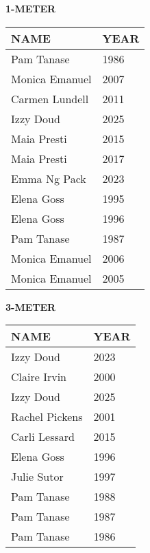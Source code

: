 \begin{table}[H]
\centering
\begin{minipage}[t]{0.6\textwidth}
\centering
\textbf{1-METER}\\[0.1cm]
\begin{tabular}{@{}p{2.8cm}p{1.2cm}@{}}
\hline
    \textbf{NAME} & \textbf{YEAR} \\
\hline
    Pam Tanase & 1986 \\
    Monica Emanuel & 2007 \\
    Carmen Lundell & 2011 \\
    Izzy Doud & 2025 \\
    Maia Presti & 2015 \\
    Maia Presti & 2017 \\
    Emma Ng Pack & 2023 \\
    Elena Goss & 1995 \\
    Elena Goss & 1996 \\
    Pam Tanase & 1987 \\
    Monica Emanuel & 2006 \\
    Monica Emanuel & 2005 \\
\hline
\end{tabular}
\end{minipage}
\end{table}

\begin{table}[H]
\centering
\begin{minipage}[t]{0.6\textwidth}
\centering
\textbf{3-METER}\\[0.1cm]
\begin{tabular}{@{}p{2.8cm}p{1.2cm}@{}}
\hline
    \textbf{NAME} & \textbf{YEAR} \\
\hline
    Izzy Doud & 2023 \\
    Claire Irvin & 2000 \\
    Izzy Doud & 2025 \\
    Rachel Pickens & 2001 \\
    Carli Lessard & 2015 \\
    Elena Goss & 1996 \\
    Julie Sutor & 1997 \\
    Pam Tanase & 1988 \\
    Pam Tanase & 1987 \\
    Pam Tanase & 1986 \\
\hline
\end{tabular}
\end{minipage}
\end{table}


